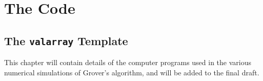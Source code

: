 
\chapter{The Code}
\label{chap:code}

\section{The \texttt{valarray} Template}

This chapter will contain details of the computer programs used
in the various numerical simulations of Grover's algorithm, and
will be added to the final draft.


